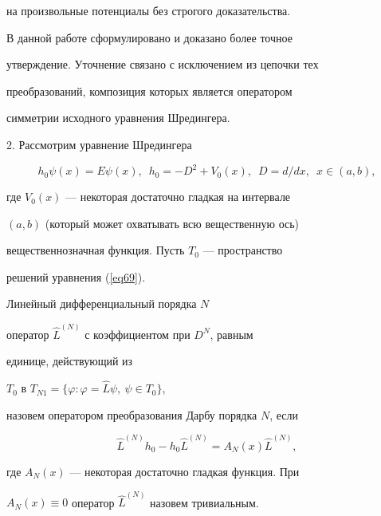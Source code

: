 на произвольные потенциалы без строгого доказательства.


В данной работе сформулировано и доказано более точное


утверждение. Уточнение связано с исключением из цепочки тех


преобразований, композиция которых является оператором


симметрии исходного уравнения Шредингера.


\medskip





2. Рассмотрим уравнение Шредингера


\begin{equation}


\label{eq69}


h_0\psi (x)=E\psi (x), \ \; h_0=-D^2+V_0(x), \ \; D=d/dx, \ \;


x\in (a,b),


\end{equation}


где $V_0(x)$ --- некоторая достаточно гладкая на интервале


$(a,b)$ (который может охватывать всю вещественную ось)


вещественнозначная функция. Пусть $T_0$ --- пространство


решений уравнения (\ref{eq69}).





\begin{defnnonum}


Линейный дифференциальный порядка $N$


оператор $\widehat L^{(N)}$ с коэффициентом при $D^N$, равным


единице, действующий из


$T_{0}$ в $T_{N1}=$$\{\varphi:\varphi =\widehat{L}\psi,\


\psi \in T_{0}\}$,


назовем оператором преобразования Дарбу порядка $N$, если


\begin{equation}


\widehat{L}^{(N)}h_0-


h_0\widehat{L}^{(N)}=A_N(x)\widehat{L}^{(N)},


\label{eq72}


\end{equation}


где $A_N(x)$ --- некоторая достаточно гладкая функция. При


$A_N(x)\equiv 0$ оператор $\widehat{L}^{(N)}$ назовем тривиальным.


\end{defnnonum}





